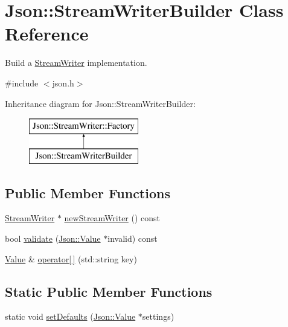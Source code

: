 \hypertarget{class_json_1_1_stream_writer_builder}{}\section{Json\+:\+:Stream\+Writer\+Builder Class Reference}
\label{class_json_1_1_stream_writer_builder}


Build a \hyperlink{class_json_1_1_stream_writer}{Stream\+Writer} implementation.  




{\ttfamily \#include $<$json.\+h$>$}

Inheritance diagram for Json\+:\+:Stream\+Writer\+Builder\+:\begin{figure}[H]
\begin{center}
\leavevmode
\includegraphics[height=2.000000cm]{class_json_1_1_stream_writer_builder}
\end{center}
\end{figure}
\subsection*{Public Member Functions}
\begin{DoxyCompactItemize}
\item 
\hyperlink{class_json_1_1_stream_writer}{Stream\+Writer} $\ast$ \hyperlink{class_json_1_1_stream_writer_builder_a96c85792f6680835094917ee93915e4b}{new\+Stream\+Writer} () const 
\item 
bool \hyperlink{class_json_1_1_stream_writer_builder_aa1dfed085a3d369e953e4a3c34da009e}{validate} (\hyperlink{class_json_1_1_value}{Json\+::\+Value} $\ast$invalid) const 
\item 
\hyperlink{class_json_1_1_value}{Value} \& \hyperlink{class_json_1_1_stream_writer_builder_aa010a8a04a92343179f64a5dbb5df340}{operator\mbox{[}$\,$\mbox{]}} (std\+::string key)
\end{DoxyCompactItemize}
\subsection*{Static Public Member Functions}
\begin{DoxyCompactItemize}
\item 
static void \hyperlink{class_json_1_1_stream_writer_builder_a53bf106b141e28637b01ad0ecd2acbf6}{set\+Defaults} (\hyperlink{class_json_1_1_value}{Json\+::\+Value} $\ast$settings)
\end{DoxyCompactItemize}

